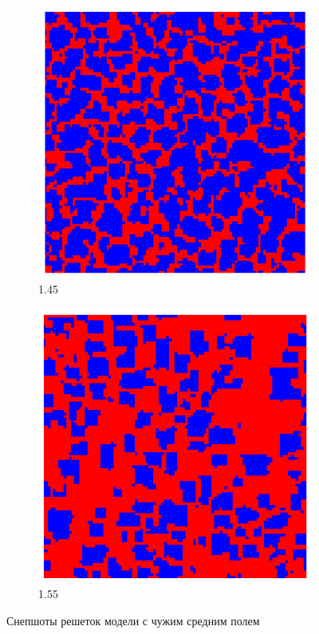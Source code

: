 \documentclass[a4paper]{article}
\begin{document}
\begin{figure}[H]
	\begin{subfigure}{.5\textwidth}
		\includegraphics[width=.8\linewidth]{1.45-1.55-1.png}
		\caption{1.45}
	\end{subfigure}
	\begin{subfigure}{.5\textwidth}
		\includegraphics[width=.8\linewidth]{1.45-1.55-2.png}
		\caption{1.55}
	\end{subfigure}%
	\caption{Снепшоты решеток модели с чужим средним полем}
	\end{figure}		
\end{document}
